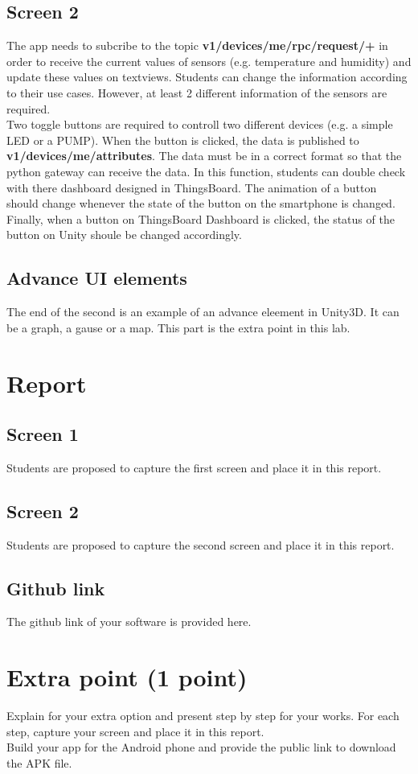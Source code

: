\documentclass[a4paper,11pt]{article}
\theoremstyle{mytheor}
\begin{document}
\subsection{Screen 2}
The app needs to subcribe to the topic \textbf{v1/devices/me/rpc/request/+} in order to receive the current values of sensors (e.g. temperature and humidity) and update these values on textviews. Students can change the information according to their use cases. However, at least 2 different information of the sensors are required.\\

Two toggle buttons are required to controll two different devices (e.g. a simple LED or a PUMP). When the button is clicked, the data is published to \textbf{v1/devices/me/attributes}. The data must be in a correct format so that the python gateway can receive the data. In this function, students can double check with there dashboard designed in ThingsBoard. The animation of a button should change whenever the state of the button on the smartphone is changed.\\ 

Finally, when a button on ThingsBoard Dashboard is clicked, the status of the button on Unity shoule be changed accordingly.

\subsection{Advance UI elements}
The end of the second is an example of an advance eleement in Unity3D. It can be a graph, a gause or a map. This part is the extra point in this lab.

\section{Report}
\subsection{Screen 1}
Students are proposed to capture the first screen and place it in this report.

\subsection{Screen 2}
Students are proposed to capture the second screen and place it in this report.

\subsection{Github link}
The github link of your software is provided here.

\section{Extra point (1 point)}
Explain for your extra option and present step by step for your works. For each step, capture your screen and place it in this report.\\

Build your app for the Android phone and provide the public link to download the APK file.
\end{document}
